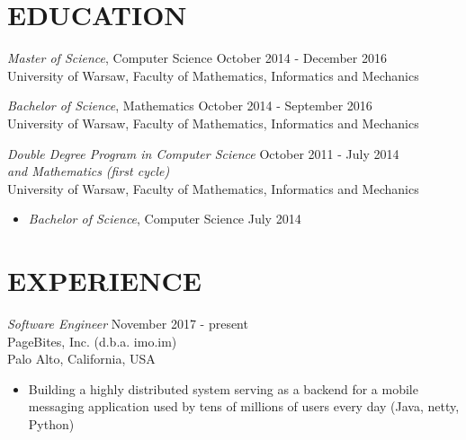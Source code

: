 \documentclass[margin, 10pt]{res} %
\begin{document}
\begin{resume}


\section{EDUCATION}

{\sl Master of Science}, Computer Science \hfill October 2014 - December 2016 \\
University of Warsaw, Faculty of Mathematics, Informatics and Mechanics

{\sl Bachelor of Science}, Mathematics \hfill October 2014 - September 2016\\
University of Warsaw, Faculty of Mathematics, Informatics and Mechanics

{\sl Double Degree Program in Computer Science} \hfill October 2011 - July 2014 \\ {\sl and Mathematics (first cycle)} \\
University of Warsaw, Faculty of Mathematics, Informatics and Mechanics
\begin{itemize}
\item {\sl Bachelor of Science}, Computer Science \hfill July 2014
\end{itemize}
 
\section{EXPERIENCE}

{\sl Software Engineer} \hfill November 2017 - present \\
PageBites, Inc. (d.b.a. imo.im) \\
Palo Alto, California, USA

\begin{itemize} \itemsep -2pt %
\item Building a highly distributed system serving as a backend for a mobile messaging application used by tens of millions of users every day (Java, netty, Python)
\end{itemize}


\end{resume}
\end{document}
